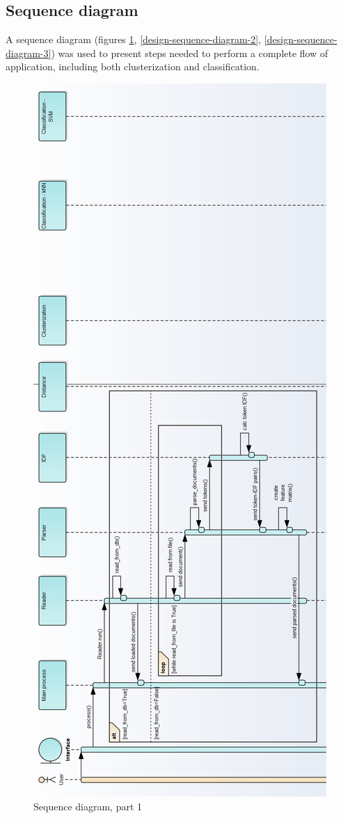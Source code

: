\subsection{Sequence diagram}
A sequence diagram (figures \ref{design-sequence-diagram-1}, \ref{design-sequence-diagram-2}, \ref{design-sequence-diagram-3}) was used to present steps needed to perform a complete flow of application, including both clusterization and classification.

\begin{figure}[H]
	\begin{center}
		\includegraphics[width=0.6\linewidth]{images/diagrams/seq1-h.png}
		\caption{Sequence diagram, part 1}
		\label{design-sequence-diagram-1}
	\end{center}
\end{figure}

